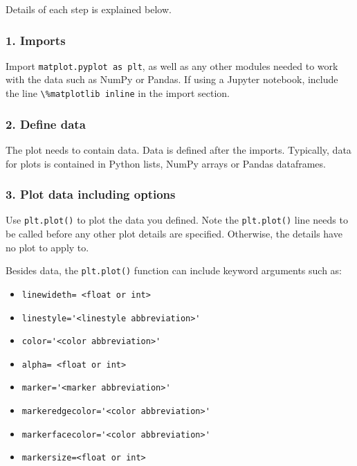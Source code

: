 \documentclass{book}
\providecommand{\tightlist}{%
      \setlength{\itemsep}{0pt}\setlength{\parskip}{0pt}}
\newcommand{\passthrough}[1]{#1}
\begin{document}
Details of each step is explained below.

\hypertarget{imports}{%
\subsubsection{1. Imports}\label{imports}}

Import \passthrough{\lstinline!matplot.pyplot as plt!}, as well as any
other modules needed to work with the data such as NumPy or Pandas. If
using a Jupyter notebook, include the line
\passthrough{\lstinline!\%matplotlib inline!} in the import section.

\hypertarget{define-data}{%
\subsubsection{2. Define data}\label{define-data}}

The plot needs to contain data. Data is defined after the imports.
Typically, data for plots is contained in Python lists, NumPy arrays or
Pandas dataframes.

\hypertarget{plot-data-including-options}{%
\subsubsection{3. Plot data including
options}\label{plot-data-including-options}}

Use \passthrough{\lstinline!plt.plot()!} to plot the data you defined.
Note the \passthrough{\lstinline!plt.plot()!} line needs to be called
before any other plot details are specified. Otherwise, the details have
no plot to apply to.

Besides data, the \passthrough{\lstinline!plt.plot()!} function can
include keyword arguments such as:

\begin{itemize}
\tightlist
\item
  \passthrough{\lstinline!linewideth= <float or int>!}
\item
  \passthrough{\lstinline!linestyle='<linestyle abbreviation>'!}
\item
  \passthrough{\lstinline!color='<color abbreviation>'!}
\item
  \passthrough{\lstinline!alpha= <float or int>!}
\item
  \passthrough{\lstinline!marker='<marker abbreviation>'!}
\item
  \passthrough{\lstinline!markeredgecolor='<color abbreviation>'!}
\item
  \passthrough{\lstinline!markerfacecolor='<color abbreviation>'!}
\item
  \passthrough{\lstinline!markersize=<float or int>!}
\end{itemize}
\end{document}
